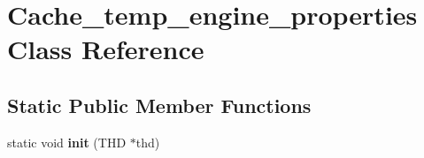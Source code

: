 \hypertarget{classCache__temp__engine__properties}{}\section{Cache\+\_\+temp\+\_\+engine\+\_\+properties Class Reference}
\label{classCache__temp__engine__properties}
\subsection*{Static Public Member Functions}
\begin{DoxyCompactItemize}
\item 
\mbox{\label{classCache__temp__engine__properties_a04441eebf4ed6e8918ef8fca5a413c51}} 
static void {\bfseries init} (T\+HD $\ast$thd)
\end{DoxyCompactItemize}
